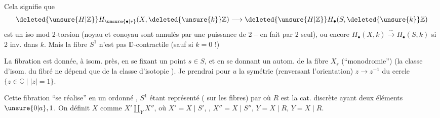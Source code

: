 
 Cela signifie que
\[\deleted{\unsure{H|\mathbb Z}}H_{\unsure{\bullet|*}}(X,\deleted{\unsure{k}}\mathbb Z)\longrightarrow\deleted{\unsure{H|\mathbb Z}}H_{\bullet}(S,\deleted{\unsure{k}}\mathbb Z)\]
est un iso mod 2-torsion (noyau et conoyau sont annulés par une puissance de 2 -- en fait par 2 seul), ou encore $H_{\bullet}(X,k)\xrightarrow{\sim}H_{\bullet}(S,k)$ si 2 inv. dans $k$. Mais la fibre $S^1$ n'est pas $\mathbb D$-contractile (sauf si $k=0$ !)

 La fibration est donnée, à isom.  près, en se fixant un point $s\in S$, et en se donnant  un autom.  de la fibre $X_s$  (``monodromie'') (la classe d'isom. du fibré ne dépend que de la classe d'isotopie ). Je prendrai pour $u$ la symétrie (renversant l'orientation) $z\longrightarrow z^{-1}$ du cercle  $\{z\in\mathbb C\mid |z|=1\}$.

Cette fibration ``se réalise''   en un ordonné , $S^1$ étant représenté (  sur les fibres) par
où $R$ est la cat. discrète ayant deux éléments $\unsure{0|a},1$. On définit $X$  comme $X'\amalg_Y X''$, où $X'=X\mid S'$, , $X''=X\mid S''$, $Y=X\mid R$,  $Y=X\mid R$.

